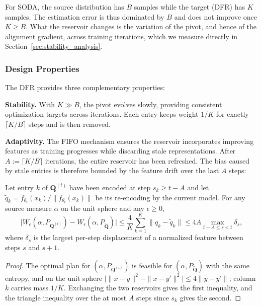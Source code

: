 For SODA, the source distribution has $B$ samples while the target (DFR) has $K$ samples. The estimation error is thus dominated by $B$ and does not improve once $K \geq B$. What the reservoir changes is the variation of the pivot, and hence of the alignment gradient, across training iterations, which we measure directly in Section~\ref{sec:stability_analysis}.

\subsubsection{Design Properties}

The DFR provides three complementary properties:

\textbf{Stability.} With $K \gg B$, the pivot evolves slowly, providing consistent optimization targets across iterations. Each entry keeps weight $1/K$ for exactly $\lceil K/B\rceil$ steps and is then removed.

\textbf{Adaptivity.} The FIFO mechanism ensures the reservoir incorporates improving features as training progresses while discarding stale representations. After $A:=\lceil K/B\rceil$ iterations, the entire reservoir has been refreshed. The bias caused by stale entries is therefore bounded by the feature drift over the last $A$ steps:

\begin{proposition}
\label{prop:staleness}
Let entry $k$ of $\mathbf Q^{(t)}$ have been encoded at step $s_k\ge t-A$ and let $\tilde q_k=f_{\theta_t}(x_k)/\|f_{\theta_t}(x_k)\|$ be its re-encoding by the current model. For any source measure $\alpha$ on the unit sphere and any $\epsilon\ge0$,
\begin{equation}
\big|W_\epsilon(\alpha,P_{\mathbf Q^{(t)}})-W_\epsilon(\alpha,P_{\tilde{\mathbf Q}})\big|\le\frac{4}{K}\sum_{k=1}^K\|q_k-\tilde q_k\|\le 4A\max_{t-A\le s<t}\delta_s ,
\end{equation}
where $\delta_s$ is the largest per-step displacement of a normalized feature between steps $s$ and $s+1$.
\end{proposition}
\begin{proof}
The optimal plan for $(\alpha,P_{\mathbf Q^{(t)}})$ is feasible for $(\alpha,P_{\tilde{\mathbf Q}})$ with the same entropy, and on the unit sphere $\big|\|x-y\|^2-\|x-y'\|^2\big|\le4\|y-y'\|$; column $k$ carries mass $1/K$. Exchanging the two reservoirs gives the first inequality, and the triangle inequality over the at most $A$ steps since $s_k$ gives the second.
\end{proof}

